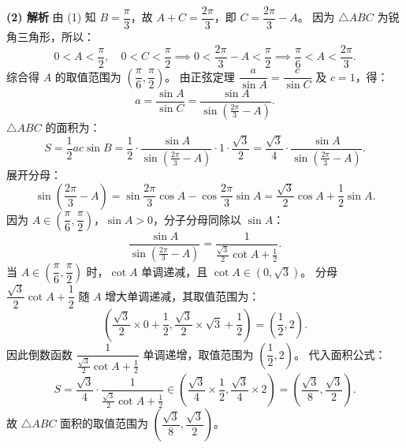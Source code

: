\begin{answer}
\textbf{(2) 解析}
由 (1) 知 $B = \dfrac{\pi}{3}$，故 $A + C = \dfrac{2\pi}{3}$，即 $C = \dfrac{2\pi}{3} - A$。
因为 $\triangle ABC$ 为锐角三角形，所以：
\nopagebreak[4]
\[0 < A < \frac{\pi}{2}, \quad 0 < C < \frac{\pi}{2} \implies 0 < \frac{2\pi}{3} - A < \frac{\pi}{2} \implies \frac{\pi}{6} < A < \frac{2\pi}{3}.\]
综合得 $A$ 的取值范围为 $\left(\dfrac{\pi}{6}, \dfrac{\pi}{2}\right)$。
由正弦定理 $\dfrac{a}{\sin A} = \dfrac{c}{\sin C}$ 及 $c = 1$，得：
\nopagebreak[4]
\[a = \frac{\sin A}{\sin C} = \frac{\sin A}{\sin\left(\frac{2\pi}{3} - A\right)}.\]
$\triangle ABC$ 的面积为：
\nopagebreak[4]
\[S = \frac{1}{2}ac \sin B = \frac{1}{2} \cdot \frac{\sin A}{\sin\left(\frac{2\pi}{3} - A\right)} \cdot 1 \cdot \frac{\sqrt{3}}{2} = \frac{\sqrt{3}}{4} \cdot \frac{\sin A}{\sin\left(\frac{2\pi}{3} - A\right)}.\]
展开分母：
\nopagebreak[4]
\[\sin\left(\frac{2\pi}{3} - A\right) = \sin\frac{2\pi}{3}\cos A - \cos\frac{2\pi}{3}\sin A = \frac{\sqrt{3}}{2}\cos A + \frac{1}{2}\sin A.\]
因为 $A \in \left(\dfrac{\pi}{6}, \dfrac{\pi}{2}\right)$，$\sin A > 0$，分子分母同除以 $\sin A$：
\nopagebreak[4]
\[\frac{\sin A}{\sin\left(\frac{2\pi}{3} - A\right)} = \frac{1}{\frac{\sqrt{3}}{2}\cot A + \frac{1}{2}}.\]
当 $A \in \left(\dfrac{\pi}{6}, \dfrac{\pi}{2}\right)$ 时，$\cot A$ 单调递减，且 $\cot A \in (0, \sqrt{3})$。
分母 $\dfrac{\sqrt{3}}{2}\cot A + \dfrac{1}{2}$ 随 $A$ 增大单调递减，其取值范围为：
\nopagebreak[4]
\[\left(\frac{\sqrt{3}}{2} \times 0 + \frac{1}{2}, \frac{\sqrt{3}}{2} \times \sqrt{3} + \frac{1}{2}\right) = \left(\frac{1}{2}, 2\right).\]
因此倒数函数 $\dfrac{1}{\frac{\sqrt{3}}{2}\cot A + \frac{1}{2}}$ 单调递增，取值范围为 $\left(\dfrac{1}{2}, 2\right)$。
代入面积公式：
\nopagebreak[4]
\[S = \frac{\sqrt{3}}{4} \cdot \frac{1}{\frac{\sqrt{3}}{2}\cot A + \frac{1}{2}} \in \left(\frac{\sqrt{3}}{4} \times \frac{1}{2}, \frac{\sqrt{3}}{4} \times 2\right) = \left(\frac{\sqrt{3}}{8}, \frac{\sqrt{3}}{2}\right).\]
故 $\triangle ABC$ 面积的取值范围为 $\left(\dfrac{\sqrt{3}}{8}, \dfrac{\sqrt{3}}{2}\right)$。



\end{answer}
